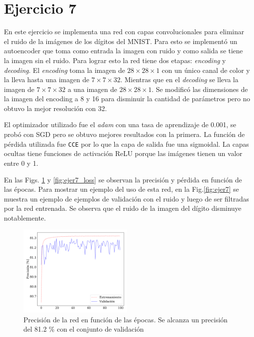 \section*{Ejercicio 7}

    En este ejercicio se implementa una red con capas convolucionales  para eliminar el ruido de la imágenes de los dígitos del MNIST. Para esto se implementó un autoencoder que toma como entrada la imagen  con ruido y como salida se tiene la imagen sin el ruido. Para lograr esto la red tiene dos etapas: \emph{encoding} y \emph{decoding}. El \emph{encoding} toma la imagen de $28\times28\times1$ con un único canal de color y la lleva hasta una imagen de $7\times7\times32$. Mientras que en el \emph{decoding} se lleva la imagen de $7\times7\times32$ a una imagen de $28\times28\times1$.   Se modificó las dimensiones de la imagen del encoding a 8 y 16 para disminuir la cantidad de parámetros pero no obtuvo la mejor resolución con 32.

    El optimizador utilizado fue el \emph{adam} con una tasa de aprendizaje de 0.001, se probó con SGD pero se obtuvo mejores resultados con la primera. La función de pérdida utilizada fue \verb|CCE| por lo que la capa de salida fue una sigmoidal. La capas ocultas tiene funciones de activación ReLU porque las imágenes tienen un valor entre 0 y 1.


    En las Figs. \ref{fig:ejer7_acc} y \ref{fig:ejer7_loss} se observan la precisión y pérdida en función de las épocas. Para mostrar un ejemplo del uso de esta red, en la Fig.\ref{fig:ejer7} se muestra un ejemplo de ejemplos de validación con el ruido y luego de ser filtradas por la red entrenada. Se observa que el ruido de la imagen del dígito disminuye notablemente.

    \begin{figure}[H]
        \begin{small}
            \begin{center}
                \includegraphics[width=0.5\textwidth]{Graphs/ejer7_acc.pdf}
            \end{center}
            \caption{Precisión de la red en función de las épocas. Se alcanza un precisión del 81.2 \% con el conjunto de validación}
            \label{fig:ejer7_acc}
        \end{small}
    \end{figure}



